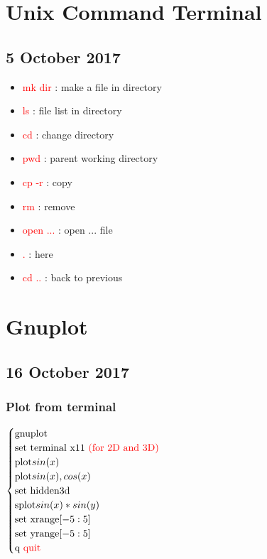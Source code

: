\documentclass[a4paper,10pt]{article}
\begin{document}
	
\section{Unix Command Terminal}

\subsection{5 October 2017}
\begin{itemize}
	\item \textcolor{red}{mk dir} : make a file in directory
	\item \textcolor{red}{ls} : file list in directory
	\item \textcolor{red}{cd} : change directory
	\item \textcolor{red}{pwd} : parent working directory
	\item \textcolor{red}{cp -r} : copy
	\item \textcolor{red}{rm} : remove
	\item \textcolor{red}{open ...} : open ... file
	\item \textcolor{red}{.} : here
	\item \textcolor{red}{cd ..} : back to previous
\end{itemize}

\section{Gnuplot}

\subsection{16 October 2017}
\subsubsection{Plot from terminal}
$ \begin{cases}
	\text{gnuplot} \\
	\text{set terminal x11 \textcolor{red}{(for 2D and 3D)}} \\
	\text{plot} sin(x) \\
	\text{plot} sin(x), cos(x) \\
	\text{set hidden3d} \\
	\text{splot} sin(x)*sin(y) \\
	\text{set xrange}[-5:5] \\
	\text{set yrange}[-5:5] \\
	\text{q \textcolor{red}{quit}}	
\end{cases} $
\end{document}
